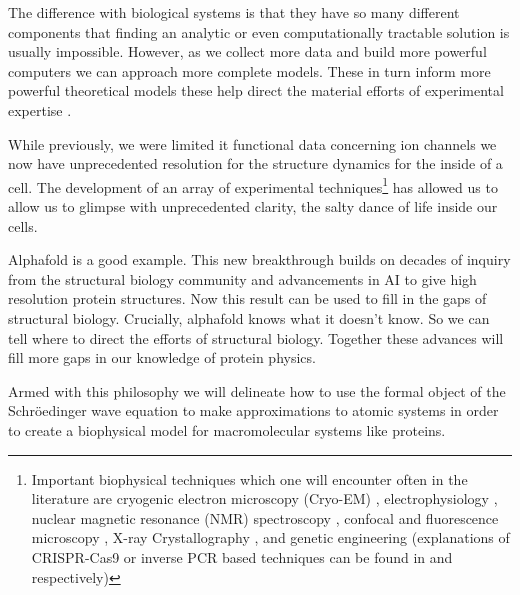The difference with biological systems is that they have so many different components that finding an analytic or even computationally tractable solution is usually impossible. However, as we collect more data and build more powerful computers we can approach more complete models. These in turn inform more powerful theoretical models these help direct the material efforts of experimental expertise . 

While previously, we were limited it functional data concerning ion channels we now have unprecedented resolution for the structure dynamics for the inside of a cell. The development of an array of experimental techniques\footnote{Important biophysical techniques which one will encounter often in the literature are cryogenic electron microscopy (Cryo-EM) \cite{cheng2015, callaway2015, callaway2020}, electrophysiology \cite{aidley1996}, nuclear magnetic resonance (NMR) spectroscopy \cite{marion2013}, confocal and fluorescence microscopy \cite{sanderson2014}, X-ray Crystallography \cite{frauenfelder2010, drenth2006}, and genetic engineering (explanations of CRISPR-Cas9 or inverse PCR based techniques can be found in \cite{silva2017} and \cite{crispr2019} respectively)} has allowed us to allow us to glimpse with unprecedented clarity, the salty dance of life inside our cells.

Alphafold is a good example. This new breakthrough builds on decades of inquiry from the structural biology community and advancements in AI to give high resolution protein structures. Now this result can be used to fill in the gaps of structural biology. Crucially, alphafold knows what it doesn't know. So we can tell where to direct the efforts of structural biology. Together these advances will fill more gaps in our knowledge of protein physics. 

Armed with this philosophy we will delineate how to use the formal object of the Schr\"oedinger wave equation to make approximations to atomic systems in order to create a biophysical model for macromolecular systems like proteins.
